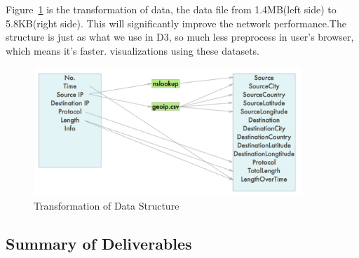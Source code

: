 \documentclass[paper=a4, fontsize=11pt]{report} %
\begin{document}
\begin{description}[style=nextline]
    \item[\href{http://sjengle.cs.usfca.edu/cs690-sonicwall/}{Transformation of Data}]
    Figure~\ref{fig:datastructure} is the transformation of data, the data file from 1.4MB(left side) to 5.8KB(right side). This will significantly improve the network performance.The structure is just as what we use in D3, so much less preprocess in user's browser, which means it's faster.
visualizations using these datasets.
       \begin{figure}[H]
        \begin{center}
            \includegraphics[width=0.9\textwidth]{datastructure.png}
        \end{center}
        \caption{Transformation of Data Structure}\label{fig:datastructure}
    \end{figure}

\end{description}


\subsection{Summary of Deliverables} %
\label{sub:deliverable}
\end{document}

